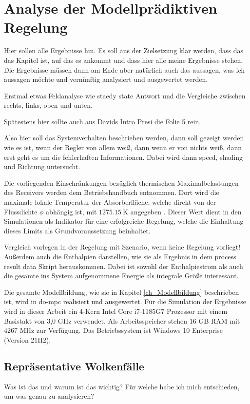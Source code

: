 \chapter{Analyse der Modellprädiktiven Regelung} \label{ch_AnalyseRegelung}
Hier sollen alle Ergebnisse hin.
Es soll aus der Zielsetzung klar werden, dass das das Kapitel ist, auf das es ankommt und dass hier alle meine Ergebnisse stehen.
Die Ergebnisse müssen dann am Ende aber natürlich auch das aussagen, was ich aussagen möchte und vernünftig analysiert und ausgewertet werden.

Erstmal etwas Feldanalyse wie staedy state Antwort und die Vergleiche zwischen rechts, links, oben und unten.

Spätestens hier sollte auch aus Davids Intro Presi die Folie 5 rein.

Also hier soll das Systemverhalten beschrieben werden, dann soll gezeigt werden wie es ist, wenn der Regler von allem weiß, dann wenn er von nichts weiß, dann erst geht es um die fehlerhaften Informationen.
Dabei wird dann speed, shading und Richtung untersucht.

Die vorliegenden Einschränkungen bezüglich thermischen Maximalbelastungen des Receivers werden dem Betriebshandbuch entnommen.
Dort wird die maximale lokale Temperatur der Absorberfläche, welche direkt von der Flussdichte $\phi$ abhängig ist, mit $\SI{1275.15}{\kelvin}$ angegeben \cite{HandbuchJülich}. Dieser Wert dient in den Simulationen als Indikator für eine erfolgreiche Regelung, welche die Einhaltung dieses Limits als Grundvoraussetzung beinhaltet.

Vergleich vorlegen in der Regelung mit Szenario, wenn keine Regelung vorliegt!
Außerdem auch die Enthalpien darstellen, wie sie als Ergebnis in dem process result data Skript herauskommen.
Dabei ist sowohl der Enthalpiestrom als auch die gesamte ins System aufgenommene Energie als integrale Größe interessant.

Die gesamte Modellbildung, wie sie in Kapitel \ref{ch_Modellbildung} beschrieben ist, wird in do-mpc realisiert und ausgewertet.
Für die Simulation der Ergebnisse wird in dieser Arbeit ein 4-Kern Intel Core i7-1185G7 Prozessor mit einem Basistakt von 3,0 GHz verwendet.
Als Arbeitsspeicher stehen 16 GB RAM mit 4267 MHz zur Verfügung.
Das Betriebssystem ist Windows 10 Enterprise (Version 21H2).

\section{Repräsentative Wolkenfälle} \label{sec_Wolkenfälle}
Was ist das und warum ist das wichtig?
Für welche habe ich mich entschieden, um was genau zu analysieren?


